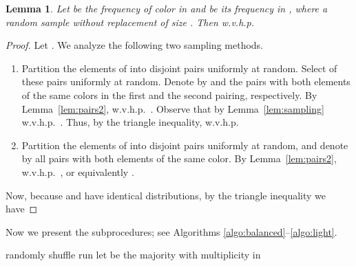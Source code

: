 \documentclass{article}[11pt,a4paper]
\newtheorem{lemma}[definition]{Lemma}
\begin{document}
\begin{lemma}
\label{lem:sum_of_squares}
Let  be the frequency of color  in  and  be its frequency in , where
 a random sample without replacement of size . Then w.v.h.p.

\end{lemma}

\begin{proof}
Let . We analyze the following two sampling methods. 

\begin{enumerate}
\item Partition the elements of  into  disjoint pairs uniformly at random.
Select  of these pairs uniformly at random. Denote by  and 
the pairs with both elements of the same colors in the first and the second pairing, respectively.
By Lemma~\ref{lem:pairs2}, w.v.h.p.\ .
Observe that by Lemma~\ref{lem:sampling} w.v.h.p.\ . Thus, by the triangle inequality, w.v.h.p.


\item Partition the elements of  into  disjoint pairs uniformly at random, and denote
by  all pairs with both elements of the same color. By Lemma~\ref{lem:pairs2}, w.v.h.p.\ 
, or equivalently
.
\end{enumerate}

Now, because  and  have identical distributions, by the triangle inequality we have

\end{proof}

Now we present the subprocedures; see Algorithms \ref{algo:balanced}--\ref{algo:light}.

\begin{algorithm}[p]
\caption{\label{algo:balanced}}
randomly shuffle \;
\;
run \;
\algseparator
let  be the majority with multiplicity  in \;
\;
\end{algorithm}
\end{document}
